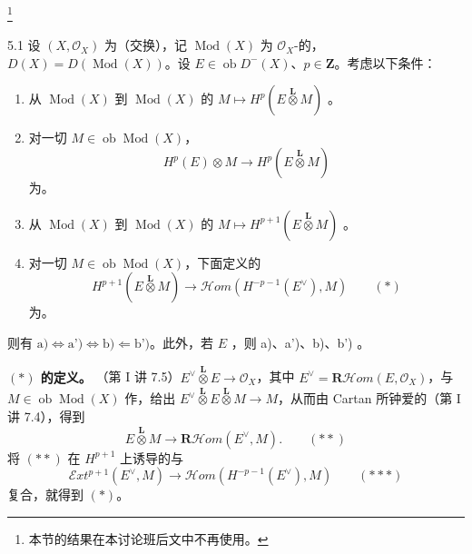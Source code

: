 \footnote{本节的结果在本讨论班后文中不再使用。}
\begin{SGAresult}{}{5.1}
设 $(X,\mathcal O_X)$ 为（交换），记 $\operatorname{Mod}(X)$ 为 $\mathcal O_X$-的，$D(X)=D(\operatorname{Mod}(X))$。设 $E\in\operatorname{ob}D^-(X)$、$p\in\mathbf Z$。考虑以下条件：
\begin{enumerate}
\item[a)] 从 $\operatorname{Mod}(X)$ 到 $\operatorname{Mod}(X)$ 的 $M\mapsto H^p(E\mathbin{\overset{\mathbf L}{\otimes}}M)$ 。
\item[a')] 对一切 $M\in\operatorname{ob}\operatorname{Mod}(X)$，
\[
H^p(E)\otimes M\longrightarrow H^p(E\mathbin{\overset{\mathbf L}{\otimes}}M)
\]
为。
\item[b)] 从 $\operatorname{Mod}(X)$ 到 $\operatorname{Mod}(X)$ 的 $M\mapsto H^{p+1}(E\mathbin{\overset{\mathbf L}{\otimes}}M)$ 。
\item[b')] 对一切 $M\in\operatorname{ob}\operatorname{Mod}(X)$，下面定义的
\[
H^{p+1}(E\mathbin{\overset{\mathbf L}{\otimes}}M)\longrightarrow
\mathcal Hom(H^{-p-1}(E^\vee),M)\qquad(*)
\]
为。
\end{enumerate}
则有 $\text{a)}\Longleftrightarrow\text{a')}\Longleftrightarrow\text{b)}\Longleftarrow\text{b')}$。此外，若 $E$ ，则 a)、a')、b)、b') 。
\end{SGAresult}
\textbf{$(*)$ 的定义。} （第 I 讲 7.5）$E^\vee\mathbin{\overset{\mathbf L}{\otimes}}E\to\mathcal O_X$，其中 $E^\vee=\mathbf R\mathcal Hom(E,\mathcal O_X)$，与 $M\in\operatorname{ob}\operatorname{Mod}(X)$ 作，给出 $E^\vee\mathbin{\overset{\mathbf L}{\otimes}}E\mathbin{\overset{\mathbf L}{\otimes}}M\to M$，从而由 Cartan 所钟爱的（第 I 讲 7.4），得到
\[
E\mathbin{\overset{\mathbf L}{\otimes}}M\longrightarrow\mathbf R\mathcal Hom(E^\vee,M).\qquad(**)
\]
将 $(**)$ 在 $H^{p+1}$ 上诱导的与
\[
\mathcal Ext^{p+1}(E^\vee,M)\longrightarrow\mathcal Hom(H^{-p-1}(E^\vee),M)\qquad(***)
\]
复合，就得到 $(*)$。
